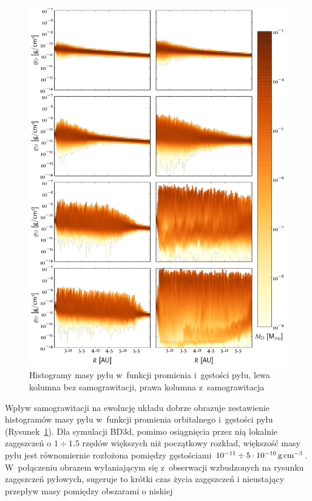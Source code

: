 \begin{figure} 
  \centering
  \includegraphics[height=0.9\textheight]{figures/hists2d}
  \caption{Histogramy masy pyłu w~funkcji promienia i~gęstości pyłu, lewa
  kolumna bez samograwitacji, prawa kolumna z~samograwitacja}
  \label{fig:hists} 
\end{figure}
%
Wpływ samograwitacji na ewolucję układu dobrze obrazuje zestawienie
histogramów masy pyłu w~funkcji promienia orbitalnego i~gęstości pyłu
(Rysunek~\ref{fig:hists}). Dla symulacji BD3d, pomimo osiągnięcia przez nią
lokalnie zagęszczeń o $1\div1.5$ rzędów większych niż początkowy rozkład,
większość masy pyłu jest równomiernie rozłożona pomiędzy gęstościami $10^{-11}
\div 5\cdot10^{-10}\hbox{$\thinspace\textrm{g}$}\hbox{$\thinspace\textrm{cm}$}^{-3}$. W~połączeniu obrazem wyłaniającym się
z~obserwacji wzbudzonych na rysunku zagęszczeń pyłowych, sugeruje to krótki czas
życia zagęszczeń i nieustający przepływ masy pomiędzy obszarami o niskiej
